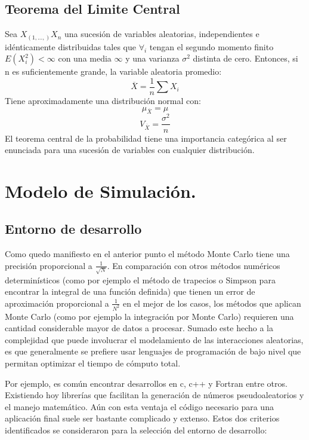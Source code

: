 \documentclass{rbf}
\begin{document}
\subsection{Teorema del Limite Central}
Sea $X_(1,...,) X_n$ una sucesión de variables aleatorias, independientes e idénticamente distribuidas tales que $\forall_i$  tengan el segundo momento finito  $E(X_i^2)<\infty$ con una media $\infty$ y una varianza $\sigma^2$ distinta de cero. Entonces, si n es suficientemente grande, la variable aleatoria promedio:
\begin{equation}
    \overline{X}=\frac{1}{n}\sum X_i
\end{equation}
Tiene aproximadamente una distribución normal con:
\begin{equation}
    \mu_{\overline{X}} =\mu
\end{equation}
\begin{equation}
    V_{\overline{X}} =\frac{\sigma^2}{n}
\end{equation}
El teorema central de la probabilidad tiene una importancia categórica al ser enunciada para una sucesión de variables con cualquier distribución. 

\section{Modelo de Simulación.}
\subsection{Entorno de desarrollo}

Como quedo manifiesto en el anterior punto el método Monte Carlo tiene una precisión proporcional a $\frac{1}{\sqrt{N}}$. En comparación con otros métodos numéricos determinísticos (como por ejemplo el método de trapecios o Simpson para encontrar la integral de una función definida) que tienen un error de aproximación proporcional a $\frac{1}{N^2}$ en el mejor de los casos, los métodos que aplican Monte Carlo (como por ejemplo la integración por Monte Carlo) requieren una cantidad considerable mayor de datos a procesar. Sumado este hecho a la complejidad que puede involucrar el modelamiento de las interacciones aleatorias, es que generalmente se prefiere usar lenguajes de programación de bajo nivel que permitan optimizar el tiempo de cómputo total.

Por ejemplo, es común encontrar desarrollos en c, c++ y Fortran entre otros. Existiendo hoy librerías que facilitan la generación de números pseudoaleatorios y el manejo matemático. Aún con esta ventaja el código necesario para una aplicación final suele ser bastante complicado y extenso.
Estos dos criterios identificados se consideraron para la selección del entorno de desarrollo:
\end{document}
